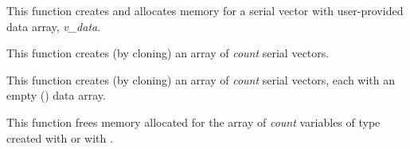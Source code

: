 \documentclass[letterpaper,10pt,english]{sphinxmanual}
\begin{document}

\begin{fulllineitems}
\label{nvectors/NVector_Serial:N_VMake_Serial}
This function creates and allocates memory for a serial vector with
user-provided data array, \emph{v\_data}.

\end{fulllineitems}


\begin{fulllineitems}
\label{nvectors/NVector_Serial:N_VCloneVectorArray_Serial}
This function creates (by cloning) an array of \emph{count} serial
vectors.

\end{fulllineitems}


\begin{fulllineitems}
\label{nvectors/NVector_Serial:N_VCloneEmptyVectorArray_Serial}
This function creates (by cloning) an array of \emph{count} serial
vectors, each with an empty () data array.

\end{fulllineitems}


\begin{fulllineitems}
\label{nvectors/NVector_Serial:N_VDestroyVectorArray_Serial}
This function frees memory allocated for the array of \emph{count}
variables of type  created with
{\hyperref[nvectors/NVector_Serial:N_VCloneVectorArray_Serial]{}} or with
{\hyperref[nvectors/NVector_Serial:N_VCloneEmptyVectorArray_Serial]{}}.

\end{fulllineitems}

\end{document}
